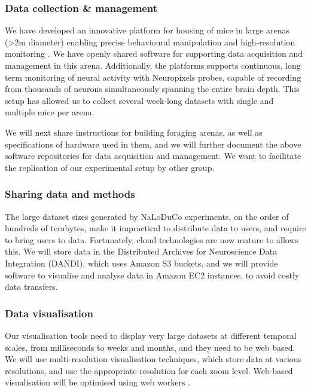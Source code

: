 \subsubsection{Data collection \& management}

We have developed an innovative platform for housing of mice in large arenas
(\textgreater 2m diameter) enabling precise behavioural manipulation and
high-resolution monitoring \citep[Figure~\ref{fig:arena}, ][]{campagnerEtAl24}.
%
We have openly shared software for supporting data acquisition
\citep{aeonacquisition} and management \citep{aeonmecha} in this
arena.
%
Additionally, the platforms supports continuous, long term monitoring of neural
activity with Neuropixels probes, capable of recording from thousands of
neurons simultaneously spanning the entire brain depth.
%
This setup has allowed us to collect several week-long datasets with single and
multiple mice per arena.

We will next share instructions for building foraging arenas, as well as
specifications of hardware used in them,
%
and we will further document the above software repositories for data acquisition
and management.
%
We want to facilitate the replication of our experimental setup by other group.



\subsubsection{Sharing data and methods}

The large dataset sizes generated by NaLoDuCo experiments, on the order of
hundreds of terabytes,  make it impractical to distribute data to users, and
require to bring users to data. Fortunately, cloud technologies are now mature
to allows this.
%
We will store data in the Distributed Archives for Neuroscience Data
Integration (DANDI), which uses Amazon S3 buckets, and we will provide software
to visualise and analyse data in Amazon EC2 instances, to avoid costly data
transfers.

\subsubsection{Data visualisation}

Our visualisation tools
need to display very large datasets at different temporal scales, from
milliseconds to weeks and months, and they need to be web based.
%
We will use multi-resolution visualisation techniques, which store data at
various resolutions, and use the appropriate resolution for each zoom level.
%
Web-based visualisation will be optimised using web workers
\citep{webWorkers}.

